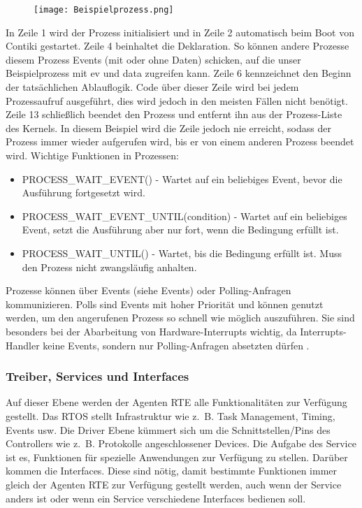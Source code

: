 \begin{figure}[h!]
	\centering
		\texttt{[image: Beispielprozess.png]}
	\label{Beispielprozess}
\end{figure}
In Zeile 1 wird der Prozess initialisiert und in Zeile 2 automatisch beim Boot von Contiki gestartet. Zeile 4 beinhaltet die
Deklaration. So k\"onnen andere Prozesse diesem Prozess Events (mit oder ohne Daten) schicken, auf die unser Beispielprozess 
mit ev und data zugreifen kann. Zeile 6 kennzeichnet den Beginn der tats\"achlichen Ablauflogik. Code \"uber dieser Zeile wird 
bei jedem Prozessaufruf ausgef\"uhrt, dies wird jedoch in den meisten F\"allen nicht ben\"otigt. Zeile 13 schlie{\ss}lich beendet
den Prozess und entfernt ihn aus der Prozess-Liste des Kernels. In diesem Beispiel wird die Zeile jedoch nie erreicht, sodass der Prozess immer wieder aufgerufen wird, bis er von einem anderen Prozess beendet wird.
Wichtige Funktionen in Prozessen:
\begin{itemize}
\item PROCESS\_WAIT\_EVENT() - Wartet auf ein beliebiges Event, bevor die Ausf\"{u}hrung fortgesetzt wird.
\item PROCESS\_WAIT\_EVENT\_UNTIL(condition) - Wartet auf ein beliebiges Event, setzt die Ausf\"{u}hrung aber nur fort, wenn die Bedingung erf\"{u}llt ist.
\item PROCESS\_WAIT\_UNTIL() - Wartet, bis die Bedingung erf\"ullt ist. Muss den Prozess nicht zwangsl\"{a}ufig anhalten.
\end{itemize}
Prozesse k\"onnen \"uber Events (siehe Events) oder Polling-Anfragen kommunizieren.  Polls sind Events mit hoher Priorit\"at und 
k\"onnen genutzt werden, um den angerufenen Prozess so schnell wie m\"oglich auszuf\"uhren. Sie
sind besonders bei der Abarbeitung von Hardware-Interrupts wichtig, da Interrupts-Handler keine Events, sondern nur
Polling-Anfragen absetzten d\"urfen \cite[vgl.][S. 7]{Walter:2010}.

\subsubsection{Treiber, Services und Interfaces}
Auf dieser Ebene werden der Agenten RTE alle Funktionalitäten zur Verfügung gestellt. Das RTOS stellt Infrastruktur wie z.~B. Task Management, Timing, Events usw.
Die Driver Ebene kümmert sich um die Schnittstellen/Pins des Controllers wie z.~B. Protokolle angeschlossener
Devices\cite[S. 26]{Stasch:Hahn}. Die Aufgabe des Service ist es, Funktionen für spezielle Anwendungen zur Verfügung zu stellen.
Darüber kommen die Interfaces. Diese sind nötig, damit bestimmte Funktionen immer gleich der Agenten RTE zur Verfügung gestellt werden, auch wenn der Service anders ist oder wenn ein Service verschiedene Interfaces bedienen soll\cite[S. 26]{Stasch:Hahn}.


